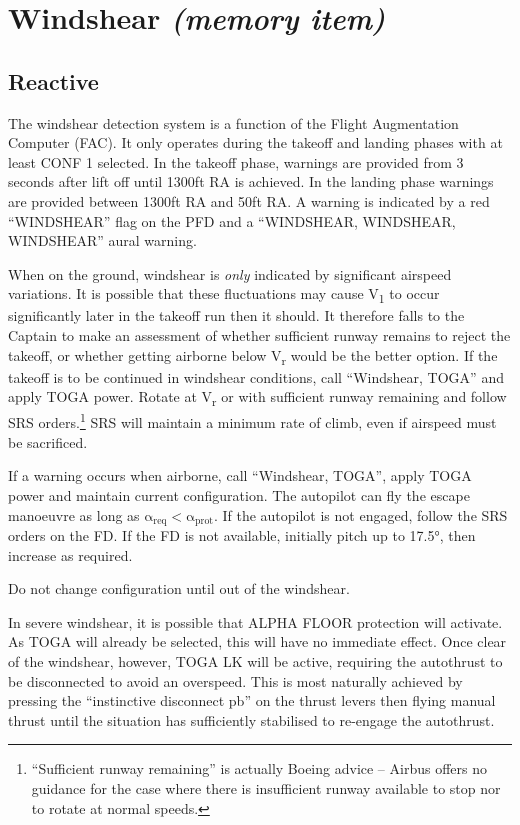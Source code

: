 \documentclass[a5paper,11pt,twoside]{book}
\newcommand{\multicite}[1]{
  \nopagebreak
  \noindent{\footnotesize\color{blue}{[ #1 ]}}
}
\newcommand{\V}[1]{V\textsubscript{#1}}
\begin{document}
\multicite{EOMB 3.80.2, QRH AEP.MISC, FCOM AEP.MISC, FCTM AEP.MISC}


\section{Windshear \emph{(memory item)}}

\subsection{Reactive}

The windshear detection system is a function of the Flight Augmentation Computer
(FAC). It only operates during the takeoff and landing phases with at least CONF
1 selected. In the takeoff phase, warnings are provided from 3 seconds after
lift off until 1300ft RA is achieved. In the landing phase warnings are provided
between 1300ft RA and 50ft RA. A warning is indicated by a red “WINDSHEAR” flag
on the PFD and a “WINDSHEAR, WINDSHEAR, WINDSHEAR” aural warning.

 When on the ground, windshear is \emph{only} indicated by significant airspeed
 variations. It is possible that these fluctuations may cause \V{1} to occur
 significantly later in the takeoff run then it should. It therefore falls to
 the Captain to make an assessment of whether sufficient runway remains to
 reject the takeoff, or whether getting airborne below \V{r} would be the better
 option. If the takeoff is to be continued in windshear conditions, call
 “Windshear, TOGA” and apply TOGA power.  Rotate at \V{r} or with sufficient
 runway remaining and follow SRS orders.\footnote{“Sufficient runway remaining”
 is actually Boeing advice – Airbus offers no guidance for the case where there
 is insufficient runway available to stop nor to rotate at normal speeds.} SRS
 will maintain a minimum rate of climb, even if airspeed must be sacrificed.

If a warning occurs when airborne, call “Windshear, TOGA”, apply TOGA power and
maintain current configuration. The autopilot can fly the escape manoeuvre as
long as $\mathrm{\alpha_{req}<\alpha_{prot}}$. If the
autopilot is not engaged, follow the SRS orders on the FD. If the FD is not
available, initially pitch up to 17.5°, then increase as required.

Do not change configuration until out of the windshear.

In severe windshear, it is possible that ALPHA FLOOR protection will
activate. As TOGA will already be selected, this will have no immediate
effect. Once clear of the windshear, however, TOGA LK will be active, requiring
the autothrust to be disconnected to avoid an overspeed. This is most naturally
achieved by pressing the “instinctive disconnect pb” on the thrust levers then
flying manual thrust until the situation has sufficiently stabilised to
re-engage the autothrust.
\end{document}
